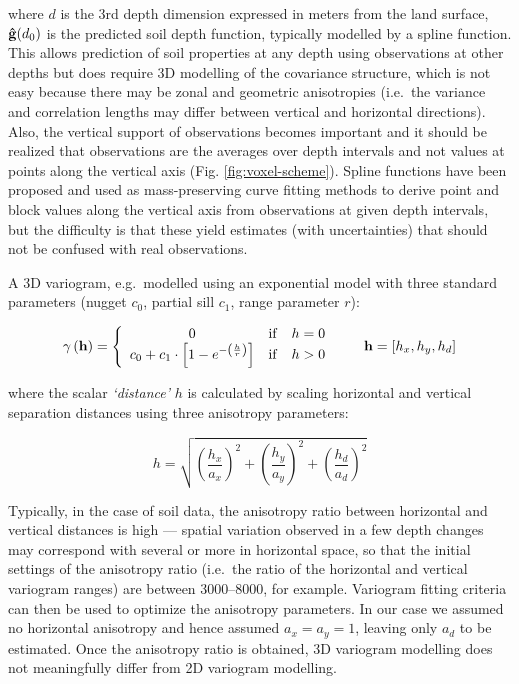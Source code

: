 \documentclass[11pt]{krantz}
\theoremstyle{definition}
\theoremstyle{definition}
\theoremstyle{definition}
\theoremstyle{remark}
\begin{document}
where \(d\) is the 3rd depth dimension expressed in meters from the land
surface, \({\bf{\hat g}}(d_0)\) is the predicted soil depth function,
typically modelled by a spline function. This allows prediction of soil
properties at any depth using observations at other depths but does
require 3D modelling of the covariance structure, which is not easy
because there may be zonal and geometric anisotropies (i.e.~the variance
and correlation lengths may differ between vertical and horizontal
directions). Also, the vertical support of observations becomes
important and it should be realized that observations are the averages
over depth intervals and not values at points along the vertical axis
(Fig. \ref{fig:voxel-scheme}). Spline functions have been proposed and
used as mass-preserving curve fitting methods to derive point and block
values along the vertical axis from observations at given depth
intervals, but the difficulty is that these yield estimates (with
uncertainties) that should not be confused with real observations.

A 3D variogram, e.g.~modelled using an exponential model with three
standard parameters (nugget \(c_0\), partial sill \(c_1\), range
parameter \(r\)):

\begin{equation}
\gamma \left( {\bf{h}} \right) = \left\{
{\begin{array}{*{20}c}
   0 & {{\rm{if}}} & {h = 0}  \\
   {c_0  + c_1  \cdot \left[ {1 - e^{ - \left( {\frac{{h}}
{r}} \right)} } \right]} & {{\rm{if}}} & {h > 0}  \\
 \end{array} } \right. \qquad {\bf{h}} =  \left[ {h_x  , h_y  , h_d } \right]
\label{eq:exp}
\end{equation}

where the scalar \emph{`distance'} \(h\) is calculated by scaling
horizontal and vertical separation distances using three anisotropy
parameters:

\begin{equation}
h = \sqrt {\left( {\frac{{h_x  }}{{a_x  }}} \right)^2  + \left( {\frac{{h_y  }}{{a_y  }}} \right)^2  + \left( {\frac{{h_d }}{{a_d }}} \right)^2 }
\label{eq:anisotropy}
\end{equation}

Typically, in the case of soil data, the anisotropy ratio between
horizontal and vertical distances is high --- spatial variation observed
in a few depth changes may correspond with several or more in horizontal
space, so that the initial settings of the anisotropy ratio (i.e.~the
ratio of the horizontal and vertical variogram ranges) are between
3000--8000, for example. Variogram fitting criteria can then be used to
optimize the anisotropy parameters. In our case we assumed no horizontal
anisotropy and hence assumed \(a_x=a_y=1\), leaving only \(a_d\) to be
estimated. Once the anisotropy ratio is obtained, 3D variogram modelling
does not meaningfully differ from 2D variogram modelling.
\end{document}
